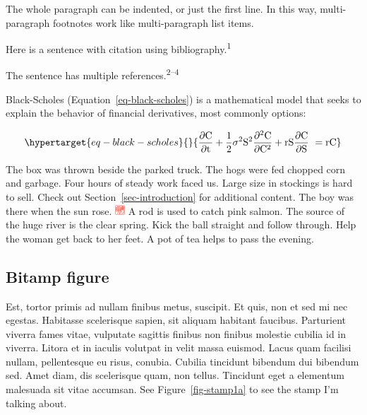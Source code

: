\documentclass[
  9pt,
  letterpaper,
  DIV=11,
  numbers=noendperiod]{scrartcl}
\begin{document}
The whole paragraph can be indented, or just the first line. In this
way, multi-paragraph footnotes work like multi-paragraph list items.

Here is a sentence with citation using bibliography.\textsuperscript{1}

The sentence has multiple references.\textsuperscript{2--4}

Black-Scholes (Equation~\ref{eq-black-scholes}) is a mathematical model
that seeks to explain the behavior of financial derivatives, most
commonly options:

\begin{equation}\protect\hypertarget{eq-black-scholes}{}{
\frac{\partial \mathrm C}{ \partial \mathrm t } + \frac{1}{2}\sigma^{2} \mathrm S^{2}
\frac{\partial^{2} \mathrm C}{\partial \mathrm C^2}
  + \mathrm r \mathrm S \frac{\partial \mathrm C}{\partial \mathrm S}\ =
  \mathrm r \mathrm C 
}\label{eq-black-scholes}\end{equation}

The box was thrown beside the parked truck. The hogs were fed chopped
corn and garbage. Four hours of steady work faced us. Large size in
stockings is hard to sell. Check out Section~\ref{sec-introduction} for
additional content. The boy was there when the sun rose.
\includegraphics[width=\textwidth,height=1em]{stamp1a.jpg} A rod is used
to catch pink salmon. The source of the huge river is the clear spring.
Kick the ball straight and follow through. Help the woman get back to
her feet. A pot of tea helps to pass the evening.

\newpage{}

\hypertarget{bitamp-figure}{%
\subsection{Bitamp figure}\label{bitamp-figure}}

Est, tortor primis ad nullam finibus metus, suscipit. Et quis, non et
sed mi nec egestas. Habitasse scelerisque sapien, sit aliquam habitant
faucibus. Parturient viverra fames vitae, vulputate sagittis finibus non
finibus molestie cubilia id in viverra. Litora et in iaculis volutpat in
velit massa euismod. Lacus quam facilisi nullam, pellentesque eu risus,
conubia. Cubilia tincidunt bibendum dui bibendum sed. Amet diam, dis
scelerisque quam, non tellus. Tincidunt eget a elementum malesuada sit
vitae accumsan. See Figure~\ref{fig-stamp1a} to see the stamp I'm
talking about.
\end{document}
